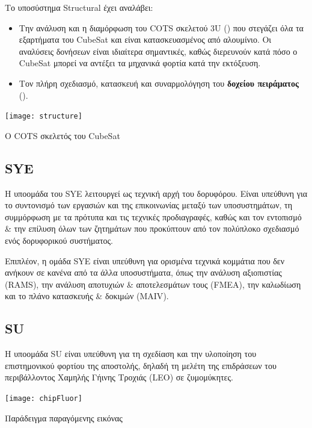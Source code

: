 \documentclass[a4paper,nobib]{tufte-book}
\begin{document}
Το υποσύστημα Structural έχει αναλάβει:
\begin{itemize}
	\item Την ανάλυση και η διαμόρφωση του \ac{COTS} σκελετού 3U () που στεγάζει όλα τα εξαρτήματα του CubeSat και είναι κατασκευασμένος από αλουμίνιο. Οι αναλύσεις δονήσεων είναι ιδιαίτερα σημαντικές, καθώς διερευνούν κατά πόσο ο CubeSat μπορεί να αντέξει τα μηχανικά φορτία κατά την εκτόξευση.
	\item Τον πλήρη σχεδιασμό, κατασκευή και συναρμολόγηση του \textbf{δοχείου πειράματος} ().
\end{itemize}

\begin{marginfigure}
	\centering
	\texttt{[image: structure]}
	\caption{Ο \acs{COTS} σκελετός του CubeSat}
	\label{fig:structure}
\end{marginfigure}

\subsection{\acf{SYE}}

Η υποομάδα του \acl{SYE} λειτουργεί ως τεχνική αρχή του δορυφόρου. Είναι υπεύθυνη για το συντονισμό των εργασιών και της επικοινωνίας μεταξύ των υποσυστημάτων, τη συμμόρφωση με τα πρότυπα και τις τεχνικές προδιαγραφές, καθώς και τον εντοπισμό \& την επίλυση όλων των ζητημάτων που προκύπτουν από τον πολύπλοκο σχεδιασμό ενός δορυφορικού συστήματος.

Επιπλέον, η ομάδα \ac{SYE} είναι υπεύθυνη για ορισμένα τεχνικά κομμάτια που δεν ανήκουν σε κανένα από τα άλλα υποσυστήματα, όπως την ανάλυση αξιοπιστίας (\acs{RAMS}), την ανάλυση αποτυχιών \& αποτελεσμάτων τους (\ac{FMEA}), την καλωδίωση και το πλάνο κατασκευής \& δοκιμών (\acs{MAIV}).

\subsection{\acf{SU}}

Η υποομάδα \acl{SU} είναι υπεύθυνη για τη σχεδίαση και την υλοποίηση του επιστημονικού φορτίου της αποστολής, δηλαδή τη μελέτη της επιδράσεων του περιβάλλοντος Χαμηλής Γήινης Τροχιάς (\ac{LEO}) σε ζυμομύκητες.

\begin{marginfigure}
	\texttt{[image: chipFluor]}
	\caption[Παράδειγμα παραγόμενης εικόνας]{Παράδειγμα παραγόμενης εικόνας \parencite{DDJF_PL}}
	\label{fig:chip_fluor}
\end{marginfigure}
\end{document}
